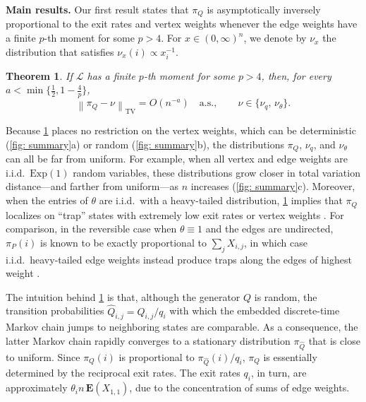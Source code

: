 \documentclass[12pt]{amsart}
\newcommand\wh[1]{\widehat{#1}}
\newtheorem{theorem}{Theorem}[section]
\newcommand{\E}{\mathbf{E}}
\DeclareMathOperator{\1}{\mathbf{1}}
\begin{document}
\medskip\noindent
{\bf Main results.} Our first result states that $\pi_Q$ is asymptotically inversely proportional to the exit rates and vertex weights whenever the edge weights have a finite $p$-th moment for some $p > 4$. For $x \in (0,\infty)^n$, we denote by $\nu_x$ the distribution that satisfies $\nu_x (i) \propto x_i^{-1}$.

\begin{theorem}\label{thm:piq}
	If $\mathcal{L}$ has a finite $p$-th moment for some $p > 4$, then, for every $a < \min\{\frac12,1 - \frac{4}{p}\}$,
	\begin{equation*}%
		\left\| \pi_Q - \nu \right\|_{\mathrm{TV}} = O (n^{-a}) \quad \mathrm{a.s.}, \quad\quad \nu \in \{\nu_q, \, \nu_\theta\}.
	\end{equation*}
\end{theorem}

Because \cref{thm:piq} places no restriction on the vertex weights, which can be deterministic (\cref{fig: summary}a) or random (\cref{fig: summary}b), the distributions $\pi_Q$, $\nu_q$, and $\nu_\theta$ can all be far from uniform. For example, when all vertex and edge weights are i.i.d.\ $\mathrm{Exp}(1)$ random variables, these distributions grow closer in total variation distance---and farther from uniform---as $n$ increases (\cref{fig: summary}c). Moreover, when the entries of $\theta$ are i.i.d.\ with a heavy-tailed distribution, \cref{thm:piq} implies that $\pi_Q$ localizes on ``trap'' states with extremely low exit rates or vertex weights \cite{MR2581889}. For comparison, in the reversible case when $\theta \equiv 1$ and the edges are undirected, $\pi_P (i)$ is known to be exactly proportional to $\sum_j X_{i,j}$, in which case i.i.d.\ heavy-tailed edge weights instead produce traps along the edges of highest weight \cite[Theorem 1.8]{MR2857250}.

The intuition behind \cref{thm:piq} is that, although the generator $Q$ is random, the transition probabilities $\wh{Q}_{i,j} = Q_{i,j}/q_i$ with which the embedded discrete-time Markov chain jumps to neighboring states are comparable. As a consequence, the latter Markov chain rapidly converges to a stationary distribution $\pi_{\wh{Q}}$ that is close to uniform. Since $\pi_Q (i)$ is proportional to $\pi_{\widehat{Q}} (i)/q_i$, $\pi_Q$ is essentially determined by the reciprocal exit rates. The exit rates $q_i$, in turn, are approximately $\theta_i n\, \E (X_{1,1})$, due to the concentration of sums of edge weights.
\end{document}
